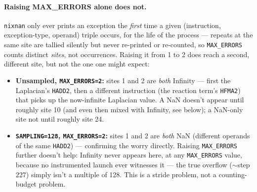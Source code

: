 \documentclass[11pt]{article}
\begin{document}
\paragraph{Raising MAX\_ERRORS alone does not.} \texttt{nixnan} only ever prints an
exception the \emph{first} time a given (instruction, exception-type, operand) triple
occurs, for the life of the process --- repeats at the same site are tallied silently but
never re-printed or re-counted, so \texttt{MAX\_ERRORS} counts distinct \emph{sites}, not
occurrences. Raising it from 1 to 2 does reach a second, different site, but not the one
one might expect:
\begin{itemize}
\item \textbf{Unsampled, \texttt{MAX\_ERRORS=2}:} sites 1 and 2 are \emph{both}
  Infinity --- first the Laplacian's \texttt{HADD2}, then a different instruction (the
  reaction term's \texttt{HFMA2}) that picks up the now-infinite Laplacian value. A NaN
  doesn't appear until roughly site 10 (and even then mixed with Infinity, see below);
  a NaN-only site not until roughly site 24.
\item \textbf{\texttt{SAMPLING=128}, \texttt{MAX\_ERRORS=2}:} sites 1 and 2 are
  \emph{both} NaN (different operands of the same \texttt{HADD2}) --- confirming the
  worry directly. Raising \texttt{MAX\_ERRORS} further doesn't help: Infinity never
  appears here, at any \texttt{MAX\_ERRORS} value, because no instrumented launch ever
  witnesses it --- the true overflow ($\sim$step 227) simply isn't a multiple of 128.
  This is a stride problem, not a counting-budget problem.
\end{itemize}
\end{document}
